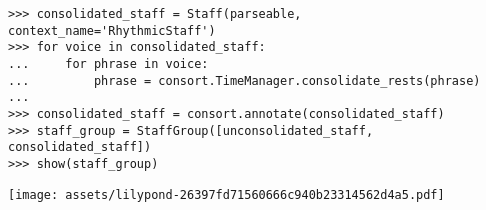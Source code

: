 \begin{comment}
<abjad>
consolidated_staff = Staff(parseable, context_name='RhythmicStaff')
for voice in consolidated_staff:
    for phrase in voice:
        phrase = consort.TimeManager.consolidate_rests(phrase)

consolidated_staff = consort.annotate(consolidated_staff)
staff_group = StaffGroup([unconsolidated_staff, consolidated_staff])
show(staff_group)
</abjad>
\end{comment}

\begin{singlespacing}
\vspace{-0.5\baselineskip}
\begin{lstlisting}
>>> consolidated_staff = Staff(parseable, context_name='RhythmicStaff')
>>> for voice in consolidated_staff:
...     for phrase in voice:
...         phrase = consort.TimeManager.consolidate_rests(phrase)
...
>>> consolidated_staff = consort.annotate(consolidated_staff)
>>> staff_group = StaffGroup([unconsolidated_staff, consolidated_staff])
>>> show(staff_group)
\end{lstlisting}
\noindent\texttt{[image: assets/lilypond-26397fd71560666c940b23314562d4a5.pdf]}
\end{singlespacing}
